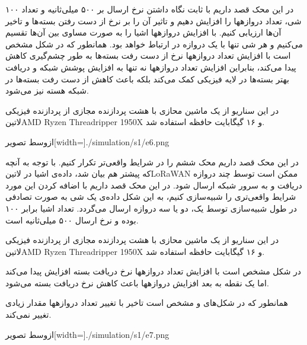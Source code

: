 
در این محک قصد داریم با ثابت نگاه داشتن نرخ ارسال بر ۵۰۰ میلی‌ثانیه و تعداد ۱۰۰ شی، تعداد دروازهها را افزایش دهیم و تاثیر آن را بر نرخ از دست رفتن بسته‌ها و تاخیر آن‌ها ارزیابی کنیم.
با افزایش دروازهها اشیا را به صورت مساوی بین آن‌ها تقسیم می‌کنیم و هر شی تنها با یک دروازه در ارتباط خواهد بود.
همانطور که در شکل  مشخص است
با افزایش تعداد دروازهها نرخ از دست رفت بسته‌ها به طور چشم‌گیری کاهش پیدا می‌کند، بنابراین افزایش تعداد دروازهها نه تنها
به افزایش پوشش شبکه و دریافت بهتر بسته‌ها در لایه فیزیکی کمک می‌کند بلکه باعث کاهش از دست رفت بسته‌ها در شبکه هسته نیز می‌شود.

در این سناریو از یک ماشین محازی با هشت پردازنده مجازی از پردازنده فیزیکی
‌لاتین{AMD Ryzen Threadripper 1950X}
و ۱۶ گیگابایت حافظه استفاده شد.

‌ازوسط
‌تصویر[width=\textwidth]{./simulation/s1/e6.png}


در این محک قصد داریم محک ششم را در شرایط واقعی‌تر تکرار کنیم. با توجه به آنچه که پیشتر هم بیان شد، داده‌ی اشیا در ‌لاتین{LoRaWAN}
ممکن است توسط چند دروازه دریافت و به سرور شبکه ارسال شود. در این محک قصد داریم با اضافه کردن این مورد شرایط واقعی‌تری را شبیه‌سازی کنیم،
به این شکل داده‌ی یک شی به صورت تصادفی در طول شبیه‌سازی توسط یک، دو یا سه دروازه ارسال می‌گردد.
تعداد اشیا برابر ۱۰۰ بوده و نرخ ارسال ۵۰۰ میلی‌ثانیه است.

در این سناریو از یک ماشین محازی با هشت پردازنده مجازی از پردازنده فیزیکی
‌لاتین{AMD Ryzen Threadripper 1950X}
و ۱۶ گیگابایت حافظه استفاده شد.

در شکل 
مشخص است با افزایش تعداد دروازهها نرخ دریافت بسته افزایش پیدا می‌کند اما یک نقطه به بعد
افزایش دروازهها باعث کاهش نرخ دریافت بسته می‌شود.

همانطور که در شکل‌های 
و 
مشخص است تاخیر با تغییر تعداد دروازهها مقدار زیادی تغییر نمی‌کند.

‌ازوسط
‌تصویر[width=\textwidth]{./simulation/s1/e7.png}

